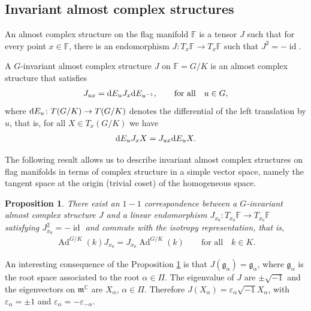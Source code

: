 \documentclass[10pt,a4paper]{amsart}
\numberwithin{equation}{section}
\newtheorem{Proposition}[Theorem]{Proposition}
 { \theoremstyle{definition}
\newtheorem{Definition}[Theorem]{Definition}
\newtheorem{Question}[Theorem]{Question}
\newtheorem*{Notation}{Notation}
\newtheorem{Example}[Theorem]{Example}
\newtheorem{Remark}[Theorem]{Remark} }
\DeclareMathOperator{\Ad}{Ad}
\DeclareMathOperator{\id}{id}
\begin{document}
\subsection{Invariant almost complex structures}
\begin{Definition}
An almost complex structure on the flag manifold $\mathbb{F}$ is a tensor $J$ such that for every point $x\in \mathbb{F}$, there is an endomorphism $J\colon T_{x}\mathbb{F}\longrightarrow T_{x}\mathbb{F}$ such that $J^{2}=-\id$.
\end{Definition}

\begin{Definition}
A $G$-invariant almost complex structure $J$ on $\mathbb{F}=G/K$ is an almost complex structure that satisfies
\begin{gather*}
J_{ux}={\rm d}E_{u}J_{x}{\rm d}E_{u^{-1}},\qquad \text{for all} \quad u\in G,
\end{gather*}
where ${\rm d}E_{u}\colon T(G/K) \to T(G/K)$ denotes the differential of the left translation by $u$, that is, for all $X\in T_{x}(G/K)$ we have
\begin{gather*}
{\rm d}E_{u}J_{x}X=J_{ux}{\rm d}E_{u}X.
\end{gather*}
\end{Definition}

The following result allows us to describe invariant almost complex structures on flag mani\-folds in terms of complex structure in a simple vector space, namely the tangent space at the origin (trivial coset) of the homogeneous space.

\begin{Proposition} \label{prop-corresp-iacs}
There exist an $1-1$ correspondence between a $G$-invariant almost complex structure $J$ and a linear endomorphism $J_{x_{0}}\colon  T_{x_{0}}\mathbb{F} \to T_{x_{0}}\mathbb{F}$ satisfying $J_{x_{0}}^2=-\id$ and commute with the isotropy representation, that is,
\begin{gather*}
\Ad^{G/K}(k)J_{x_{0}}=J_{x_{0}}\Ad^{G/K}(k) \qquad \text{for all} \quad k\in K.
\end{gather*}
\end{Proposition}

An interesting consequence of the Proposition \ref{prop-corresp-iacs} is that $J(\mathfrak{g}_{\alpha})=\mathfrak{g}_{\alpha}$, where $\mathfrak{g}_\alpha$ is the root space associated to the root $\alpha \in \Pi$. The eigenvalue of $J$ are $\pm \sqrt{-1}$ and the eigenvectors on $\mathfrak{m}^{\mathbb{C}}$ are $X_{\alpha}$, $\alpha\in\Pi$. Therefore $J(X_{\alpha})= \varepsilon_{\alpha} \sqrt{-1} X_{\alpha}$, with $\varepsilon_{\alpha}=\pm 1$ and $\varepsilon_{\alpha}=-\varepsilon_{-\alpha}$.
\end{document}
